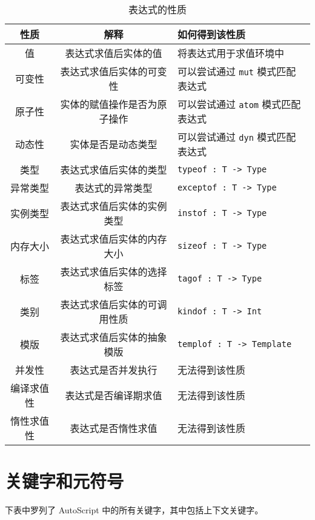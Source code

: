 \begin{table}[h]
	\centering
	\begin{tabular}{|c|c|l|} \hline
		性质 & 解释 & 如何得到该性质 \\\hline\hline
		值 & 表达式求值后实体的值 & 将表达式用于求值环境中 \\\hline
		可变性 & 表达式求值后实体的可变性 & 可以尝试通过 \lstinline!mut! 模式匹配表达式 \\\hline
        原子性 & 实体的赋值操作是否为原子操作 & 可以尝试通过 \lstinline!atom! 模式匹配表达式 \\\hline
        动态性 & 实体是否是动态类型 & 可以尝试通过 \lstinline!dyn! 模式匹配表达式 \\\hline
        类型 & 表达式求值后实体的类型 & \lstinline!typeof : T -> Type! \\\hline
        异常类型 & 表达式的异常类型 & \lstinline!exceptof : T -> Type! \\\hline
        实例类型 & 表达式求值后实体的实例类型 & \lstinline!instof : T -> Type! \\\hline
        内存大小 & 表达式求值后实体的内存大小 & \lstinline!sizeof : T -> Type! \\\hline
        标签 & 表达式求值后实体的选择标签 & \lstinline!tagof : T -> Type! \\\hline
        类别 & 表达式求值后实体的可调用性质 & \lstinline!kindof : T -> Int! \\\hline
        模版 & 表达式求值后实体的抽象模版 & \lstinline!templof : T -> Template! \\\hline
        并发性 & 表达式是否并发执行 & 无法得到该性质 \\\hline
        编译求值性 & 表达式是否编译期求值 & 无法得到该性质 \\\hline
        惰性求值性 & 表达式是否惰性求值 & 无法得到该性质 \\\hline
	\end{tabular}
	\caption{表达式的性质}
	\label{tab:expression-properties}
\end{table}

\chapter{关键字和元符号}

下表中罗列了 AutoScript 中的所有关键字，其中包括上下文关键字。

